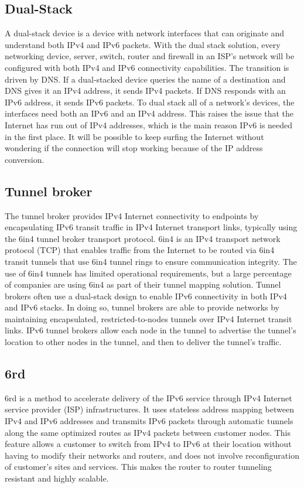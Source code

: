 \documentclass[conference,12pt]{IEEEtran}
\begin{document}
\subsection{Dual-Stack}
A dual-stack device is a device with network interfaces that can originate and understand both IPv4 and IPv6 packets. With the dual stack solution, every networking device, server, switch, router and firewall in an ISP's network will be configured with both IPv4 and IPv6 connectivity capabilities. The transition is driven by DNS. If a dual-stacked device queries the name of a destination and DNS gives it an IPv4 address, it sends IPv4 packets. If DNS responds with an IPv6 address, it sends IPv6 packets. To dual stack all of a network's devices, the interfaces need both an IPv6 and an IPv4 address. This raises the issue that the Internet has run out of IPv4 addresses, which is the main reason IPv6 is needed in the first place. It will be possible to keep surfing the Internet without wondering if the connection will stop working because of the IP address conversion.


\subsection{Tunnel broker}
The tunnel broker provides IPv4 Internet connectivity to endpoints by encapsulating IPv6 transit traffic in IPv4 Internet transport links, typically using the 6in4 tunnel broker transport protocol. 6in4 is an IPv4 transport network protocol (TCP) that enables traffic from the Internet to be routed via 6in4 transit tunnels that use 6in4 tunnel rings to ensure communication integrity. The use of 6in4 tunnels has limited operational requirements, but a large percentage of companies are using 6in4 as part of their tunnel mapping solution. Tunnel brokers often use a dual-stack design to enable IPv6 connectivity in both IPv4 and IPv6 stacks. In doing so, tunnel brokers are able to provide networks by maintaining encapsulated, restricted-to-nodes tunnels over IPv4 Internet transit links. IPv6 tunnel brokers allow each node in the tunnel to advertise the tunnel's location to other nodes in the tunnel, and then to deliver the tunnel's traffic.

\subsection{6rd}
6rd is a method to accelerate delivery of the IPv6 service through IPv4 Internet service provider (ISP) infrastructures. It uses stateless address mapping between IPv4 and IPv6 addresses and transmits IPv6 packets through automatic tunnels along the same optimized routes as IPv4 packets between customer nodes. This feature allows a customer to switch from IPv4 to IPv6 at their location without having to modify their networks and routers, and does not involve reconfiguration of customer's sites and services. This makes the router to router tunneling resistant and highly scalable.\\
\end{document}
